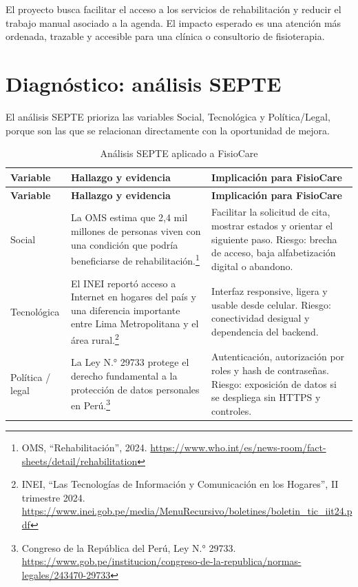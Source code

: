 \documentclass[12pt,a4paper,oneside]{report}
\begin{document}
El proyecto busca facilitar el acceso a los servicios de rehabilitación y reducir el trabajo manual asociado a la agenda. El impacto esperado es una atención más ordenada, trazable y accesible para una clínica o consultorio de fisioterapia.

\section{Diagnóstico: análisis SEPTE}
El análisis SEPTE prioriza las variables Social, Tecnológica y Política/Legal, porque son las que se relacionan directamente con la oportunidad de mejora.

\begin{longtable}{|p{2.4cm}|p{7.0cm}|p{6.0cm}|}
\caption{Análisis SEPTE aplicado a FisioCare}\label{tab:septe}\\
\hline
\rowcolor{CibertecBlue}\color{white}\textbf{Variable} & \color{white}\textbf{Hallazgo y evidencia} & \color{white}\textbf{Implicación para FisioCare}\\
\hline
\endfirsthead
\hline
\rowcolor{CibertecBlue}\color{white}\textbf{Variable} & \color{white}\textbf{Hallazgo y evidencia} & \color{white}\textbf{Implicación para FisioCare}\\
\hline
\endhead
\rowcolor{CibertecLight}
Social & La OMS estima que 2,4 mil millones de personas viven con una condición que podría beneficiarse de rehabilitación.\footnote{OMS, ``Rehabilitación'', 2024. \url{https://www.who.int/es/news-room/fact-sheets/detail/rehabilitation}} & Facilitar la solicitud de cita, mostrar estados y orientar el siguiente paso. Riesgo: brecha de acceso, baja alfabetización digital o abandono.\\ \hline
Tecnológica & El INEI reportó acceso a Internet en hogares del país y una diferencia importante entre Lima Metropolitana y el área rural.\footnote{INEI, ``Las Tecnologías de Información y Comunicación en los Hogares'', II trimestre 2024. \url{https://www.inei.gob.pe/media/MenuRecursivo/boletines/boletin_tic_iit24.pdf}} & Interfaz responsive, ligera y usable desde celular. Riesgo: conectividad desigual y dependencia del backend.\\ \hline
Política / legal & La Ley N.° 29733 protege el derecho fundamental a la protección de datos personales en Perú.\footnote{Congreso de la República del Perú, Ley N.° 29733. \url{https://www.gob.pe/institucion/congreso-de-la-republica/normas-legales/243470-29733}} & Autenticación, autorización por roles y hash de contraseñas. Riesgo: exposición de datos si se despliega sin HTTPS y controles.\\ \hline
\end{longtable}
\end{document}
